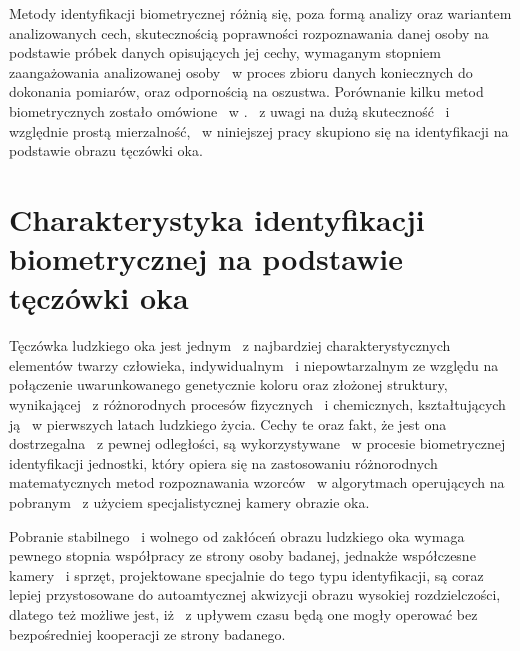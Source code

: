 Metody identyfikacji biometrycznej różnią się, poza formą analizy oraz wariantem analizowanych cech, skutecznością poprawności rozpoznawania danej osoby na podstawie próbek danych opisujących jej cechy, wymaganym stopniem zaangażowania analizowanej osoby ~w proces zbioru danych koniecznych do dokonania pomiarów, oraz odpornością na oszustwa. Porównanie kilku metod biometrycznych zostało omówione ~w \cite{Gl11}. ~z uwagi na dużą skuteczność ~i względnie prostą mierzalność, ~w niniejszej pracy skupiono się na identyfikacji na podstawie obrazu tęczówki oka.



\section{Charakterystyka identyfikacji biometrycznej na podstawie tęczówki oka}
\label{sec:zawartoscPracy}


Tęczówka ludzkiego oka jest jednym ~z najbardziej charakterystycznych elementów twarzy człowieka, indywidualnym ~i niepowtarzalnym ze względu na połączenie uwarunkowanego genetycznie koloru oraz złożonej struktury, wynikającej ~z różnorodnych procesów fizycznych ~i chemicznych, kształtujących ją ~w pierwszych latach ludzkiego życia. Cechy te oraz fakt, że jest ona  dostrzegalna ~z pewnej odległości, są wykorzystywane ~w procesie biometrycznej identyfikacji jednostki, który opiera się na zastosowaniu różnorodnych matematycznych metod rozpoznawania wzorców ~w algorytmach operujących na pobranym ~z użyciem specjalistycznej kamery obrazie oka.

Pobranie stabilnego ~i wolnego od zakłóceń obrazu ludzkiego oka wymaga pewnego stopnia współpracy ze strony osoby badanej, jednakże współczesne kamery ~i sprzęt, projektowane specjalnie do tego typu identyfikacji, są  coraz lepiej przystosowane do autoamtycznej akwizycji obrazu wysokiej rozdzielczości, dlatego też możliwe jest, iż ~z upływem czasu będą one mogły operować bez bezpośredniej kooperacji ze strony badanego.


